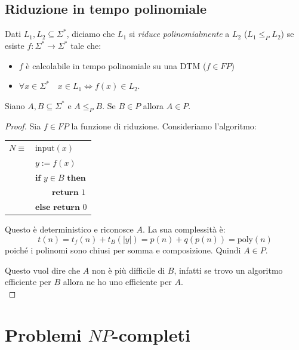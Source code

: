 \subsection{Riduzione in tempo polinomiale}

Dati $L_1, L_2 \subseteq \Sigma^*$, diciamo che $L_1$ si \emph{riduce polinomialmente} a $L_2$ ($L_1 \leq_P L_2$) se esiste $f : \Sigma^* \rightarrow \Sigma^*$ tale che:
\begin{itemize}
    \item $f$ è calcolabile in tempo polinomiale su una DTM ($f \in FP$)
    
    \item $\forall x \in \Sigma^* \quad x \in L_1 \Leftrightarrow f(x) \in L_2$.\\
\end{itemize}

\begin{theor}
Siano $A, B \subseteq \Sigma^*$ e $A \leq_P B$. Se $B \in P$ allora $A \in P$.
\end{theor}

\begin{proof}
  Sia $f \in FP$ la funzione di riduzione. Consideriamo l’algoritmo:

\begin{center}
	\begin{tabular}{r|l|}
		\cline{2-2}
		$N \equiv$	& $\text{input}(x)$ \\
			& $y := f(x) $ \\
											& $\textbf{if } y \in B \textbf{ then}$ \\
	  		& $  \quad \quad \textbf{return } 1$ \\
			& $ \textbf{else return } 0 $ \\
		\cline{2-2}
	\end{tabular}
\end{center}

Questo è deterministico e riconosce $A$. La sua complessità è:
\[
t(n) = t_f(n) + t_{B}(|y|) = p(n) + q(p(n)) = \text{poly}(n)
\]
poiché i polinomi sono chiusi per somma e composizione. Quindi $A \in P$.

Questo vuol dire che $A$ non è più difficile di $B$, infatti se trovo un algoritmo efficiente per $B$ allora ne ho uno efficiente per $A$. \\
\end{proof}

\section{Problemi $NP$-completi}

